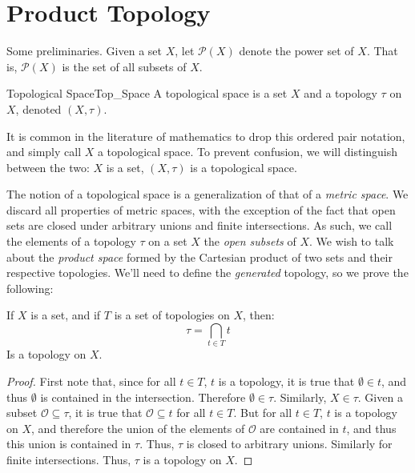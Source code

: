     \section{Product Topology}
    Some preliminaries. Given a set $X$, let
    $\mathcal{P}(X)$ denote the power set of $X$. That is,
    $\mathcal{P}(X)$ is the set of all subsets of $X$.
    \begin{ldefinition}{Topological Space}{Top_Space}
        A topological space is a set $X$ and a topology
        $\tau$ on $X$, denoted $(X,\tau)$.
    \end{ldefinition}
    It is common in the literature of mathematics to drop this
    ordered pair notation, and simply call $X$ a topological space.
    To prevent confusion, we will distinguish between the two:
    $X$ is a set, $(X,\tau)$ is a topological space.
    \par\hfill\par
    The notion of a topological space is a generalization of that
    of a \textit{metric space}. We discard all properties of
    metric spaces, with the exception of the fact that open sets
    are closed under arbitrary unions and finite intersections.
    As such, we call the elements of a topology $\tau$ on a set
    $X$ the \textit{open subsets} of $X$. We wish to talk about
    the \textit{product space} formed by the Cartesian product of
    two sets and their respective topologies. We'll need to define
    the \textit{generated} topology, so we prove the following:
    \begin{theorem}
        \label{thm:Intersec_of_Tops_is_Top}%
        If $X$ is a set, and if $T$ is a set of topologies
        on $X$, then:
        \begin{equation}
            \tau=\bigcap_{t\in{T}}t
        \end{equation}
        Is a topology on $X$.
    \end{theorem}
    \begin{proof}
        First note that, since for all $t\in{T}$, $t$ is a topology,
        it is true that $\emptyset\in{t}$, and thus $\emptyset$ is
        contained in the intersection. Therefore $\emptyset\in\tau$.
        Similarly, $X\in\tau$. Given a subset
        $\mathcal{O}\subseteq\tau$, it is true that
        $\mathcal{O}\subseteq{t}$ for all $t\in{T}$. But for all
        $t\in{T}$, $t$ is a topology on $X$, and therefore the union
        of the elements of $\mathcal{O}$ are contained in $t$, and
        thus this union is contained in $\tau$. Thus, $\tau$ is
        closed to arbitrary unions. Similarly for finite
        intersections. Thus, $\tau$ is a topology on $X$.
    \end{proof}
